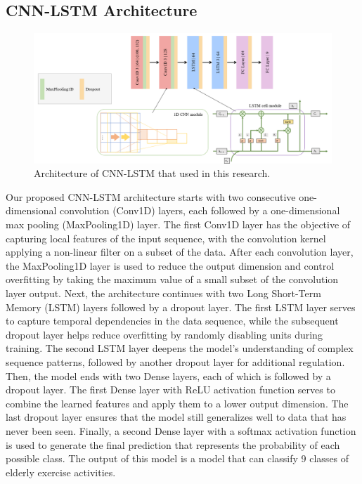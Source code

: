 \subsection{CNN-LSTM Architecture}
\begin{figure}[h!]
	\centering
	\includegraphics[width=\linewidth]{bab3/ar_CNNLSTMArch.png}
	\caption{Architecture of CNN-LSTM that used in this research.}
	\label{fig:CNNLSTMArch}
\end{figure}

Our proposed CNN-LSTM architecture starts with two consecutive one-dimensional convolution (Conv1D) layers, each followed by a one-dimensional max pooling (MaxPooling1D) layer. The first Conv1D layer has the objective of capturing local features of the input sequence, with the convolution kernel applying a non-linear filter on a subset of the data. After each convolution layer, the MaxPooling1D layer is used to reduce the output dimension and control overfitting by taking the maximum value of a small subset of the convolution layer output. Next, the architecture continues with two Long Short-Term Memory (LSTM) layers followed by a dropout layer. The first LSTM layer serves to capture temporal dependencies in the data sequence, while the subsequent dropout layer helps reduce overfitting by randomly disabling units during training. The second LSTM layer deepens the model's understanding of complex sequence patterns, followed by another dropout layer for additional regulation. Then, the model ends with two Dense layers, each of which is followed by a dropout layer. The first Dense layer with ReLU activation function serves to combine the learned features and apply them to a lower output dimension. The last dropout layer ensures that the model still generalizes well to data that has never been seen. Finally, a second Dense layer with a softmax activation function is used to generate the final prediction that represents the probability of each possible class. The output of this model is a model that can classify 9 classes of elderly exercise activities.

